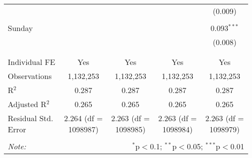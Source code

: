 \documentclass[
]{article}
\begin{document}
\begin{table}[!htbp]
{\begin{tabular}{@{\extracolsep{5pt}}lcccc}
  &  &  &  & (0.009) \\ 
  & & & & \\ 
 Sunday &  &  &  & 0.093$^{***}$ \\ 
  &  &  &  & (0.008) \\ 
  & & & & \\ 
\hline \\[-1.8ex] 
Individual FE & Yes & Yes & Yes & Yes \\ 
Observations & 1,132,253 & 1,132,253 & 1,132,253 & 1,132,253 \\ 
R$^{2}$ & 0.287 & 0.287 & 0.287 & 0.287 \\ 
Adjusted R$^{2}$ & 0.265 & 0.265 & 0.265 & 0.265 \\ 
Residual Std. Error & 2.264 (df = 1098987) & 2.263 (df = 1098985) & 2.263 (df = 1098984) & 2.263 (df = 1098979) \\ 
\hline 
\hline \\[-1.8ex] 
\textit{Note:}  & \multicolumn{4}{r}{$^{*}$p$<$0.1; $^{**}$p$<$0.05; $^{***}$p$<$0.01} \\ 
\end{tabular}
} 
\end{table} 
\newpage
\end{document}
